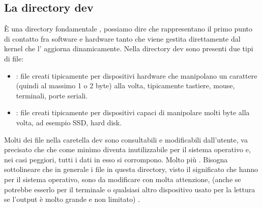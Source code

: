 \subsection{La directory dev}
\label{subsec:La-directory-dev}
È una directory fondamentale , possiamo dire che rappresentano il primo punto di contatto fra software e hardware tanto che viene gestita direttamente dal kernel che l' aggiorna dinamicamente. Nella directory dev sono presenti due tipi di file:
\begin{itemize}
    \item {}: file creati tipicamente per dispositivi hardware che manipolano un carattere (quindi al massimo 1 o 2 byte) alla volta, tipicamente tastiere, mouse, terminali, porte seriali. 
    \item {}: file creati tipicamente per dispositivi capaci di manipolare molti byte alla volta, ad esempio SSD, hard disk.
\end{itemize}
Molti dei file nella caretella dev sono consultabili e modificabili dall'utente, va precisato che  che come minimo diventa inutilizzabile per il sistema operativo e, nei casi peggiori, tutti i dati in esso si corrompono. Molto più . Bisogna sottolineare che in generale i file in questa directory, visto il significato che hanno per il sistema operativo, sono da modificare con molta attenzione,  (anche se potrebbe esserlo per il terminale o qualsiasi altro dispositivo usato per la lettura se l'output è molto grande e non limitato) .

